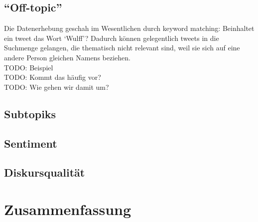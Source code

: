 \documentclass[11pt]{article}
\begin{document}
\subsection{``Off-topic''}
Die Datenerhebung geschah im Wesentlichen durch keyword matching:
Beinhaltet ein tweet das Wort `Wulff'? Dadurch können gelegentlich
tweets in die Suchmenge gelangen, die thematisch nicht relevant sind,
weil sie sich auf eine andere Person gleichen Namens beziehen.\\ 
TODO: Beispiel\\
TODO: Kommt das häufig vor?\\
TODO: Wie gehen wir damit um?

\subsection{Subtopiks}

\subsection{Sentiment}

\subsection{Diskursqualität}

\section{Zusammenfassung}






\begin{small}

\end{small}
\end{document}
